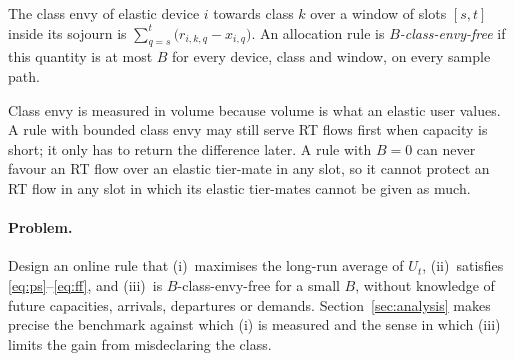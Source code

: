 \begin{definition}\label{def:envy}
The class envy of elastic device $i$ towards class $k$ over a window of slots $[s,t]$ inside its sojourn is $\sum_{q=s}^{t}\big(r_{i,k,q}-x_{i,q}\big)$.
An allocation rule is \emph{$B$-class-envy-free} if this quantity is at most $B$ for every device, class and window, on every sample path.
\end{definition}

Class envy is measured in volume because volume is what an elastic user values.
A rule with bounded class envy may still serve RT flows first when capacity is short; it only has to return the difference later.
A rule with $B=0$ can never favour an RT flow over an elastic tier-mate in any slot, so it cannot protect an RT flow in any slot in which its elastic tier-mates cannot be given as much.

\paragraph{Problem.}
Design an online rule that (i)~maximises the long-run average of $U_t$, (ii)~satisfies \eqref{eq:ps}--\eqref{eq:ff}, and (iii)~is $B$-class-envy-free for a small $B$, without knowledge of future capacities, arrivals, departures or demands.
Section~\ref{sec:analysis} makes precise the benchmark against which (i) is measured and the sense in which (iii) limits the gain from misdeclaring the class.
